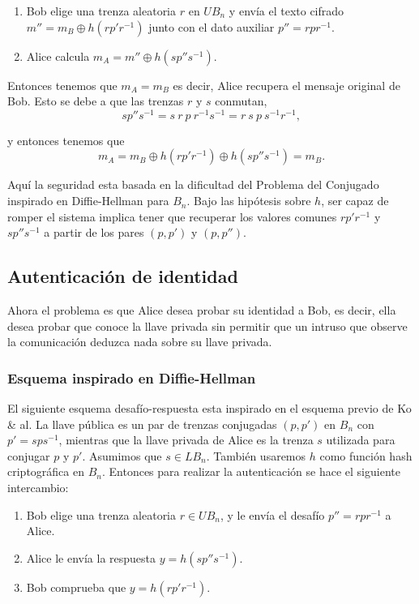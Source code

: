 \documentclass[12pt]{book}
\theoremstyle{definition}
\begin{document}
\begin{enumerate}
\item Bob elige una trenza aleatoria $r$ en $UB_n$ y envía el texto cifrado $m''=m_B\oplus h(rp'r^{-1})$ junto con el dato auxiliar $p''=rpr^{-1}$.
\item Alice calcula $m_A = m''\oplus h(sp''s^{-1})$. 

\end{enumerate}

Entonces tenemos que $m_A = m_B$ es decir, Alice recupera el mensaje original de Bob. Esto se debe a que las trenzas $r$ y $s$ conmutan,
$$sp''s^{-1}=s\ r\ p\ r^{-1}s^{-1}=r\ s\ p\ s^{-1}r^{-1},$$

y entonces tenemos que 
$$m_A = m_B\oplus h(rp'r^{-1})\oplus h(sp''s^{-1})=m_B.$$

Aquí la seguridad esta basada en la dificultad del Problema del Conjugado inspirado en Diffie-Hellman para $B_n$. Bajo las hipótesis sobre $h$, ser capaz de romper el sistema implica tener que recuperar los valores comunes $rp'r^{-1}$ y $sp''s^{-1}$ a partir de los pares $(p,p')$ y $(p,p'')$.

\subsection{Autenticación de identidad}
Ahora el problema es que Alice desea probar su identidad a Bob, es decir, ella desea probar que conoce la llave privada sin permitir que un intruso que observe la comunicación deduzca nada sobre su llave privada.

\subsubsection*{Esquema inspirado en Diffie-Hellman}

El siguiente esquema desafío-respuesta \cite{Sibert} esta inspirado en el esquema previo de Ko \& al. La llave pública es un par de trenzas conjugadas $(p,p')$ en $B_n$ con $p'=sps^{-1}$, mientras que la llave privada de Alice es la trenza $s$ utilizada para conjugar $p$ y $p'$. Asumimos que $s\in LB_n$. También usaremos $h$ como función hash criptográfica en $B_n$. Entonces para realizar la autenticación se hace el siguiente intercambio:

\begin{enumerate}
\item Bob elige una trenza aleatoria $r\in UB_n$, y le envía el desafío $p''=rpr^{-1}$ a Alice.
\item Alice le envía la respuesta $y = h(sp''s^{-1})$.
\item Bob comprueba que $y=h(rp'r^{-1})$.
\end{enumerate}
\end{document}
